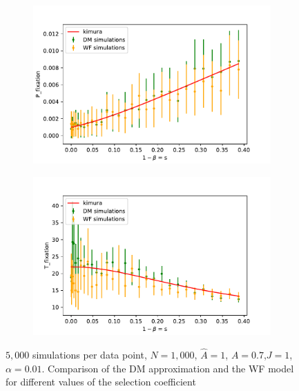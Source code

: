 \documentclass[11pt]{article}
\begin{document}
\begin{figure}[t]
  \begin{center}
  \begin{subfigure}[a]{0.49\linewidth}
    \includegraphics[width=\linewidth]{../figures/binary/fix_prob_var_beta.pdf}
   \end{subfigure}
   \begin{subfigure}[a]{0.49\linewidth}
    \includegraphics[width=\linewidth]{../figures/binary/fix_time_var_beta.pdf}
   \end{subfigure}
  \end{center}
  \caption{$5,000$ simulations per data point, $N=1,000$, $\hat{A}=1$, $A=0.7$,$J=1$,$\alpha=0.01$.
  Comparison of the DM approximation and the WF model for different values of the selection coefficient}
  \label{fig:var_beta}
\end{figure}
\end{document}
